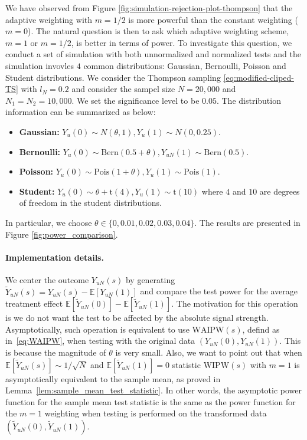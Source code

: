 \documentclass[12pt]{article}
\newcommand{\E}{\mathbb E}								%
\newcommand{\WAIPW}{\mathrm{WAIPW}}
\newcommand{\WIPW}{\mathrm{WIPW}}
\begin{document}
We have observed from Figure \ref{fig:simulation-rejection-plot-thompson} that the adaptive weighting with $m=1/2$ is more powerful than the constant weighting ($m=0$). The natural question is then to ask which adaptive weighting scheme, $m=1$ or $m=1/2$, is better in terms of power. To investigate this question, we conduct a set of simulation with both unnormalized and normalized tests and the simulation invovles $4$ common distributions: Gaussian, Bernoulli, Poisson and Student distributions. We consider the Thompson sampling \eqref{eq:modified-cliped-TS} with $l_N=0.2$ and consider the sampel size $N=20,000$ and $N_1=N_2=10,000$. We set the significance level to be $0.05$. The distribution information can be summarized as below:
\begin{itemize}
	\item \textbf{Gaussian:} $Y_{u}(0)\sim N(\theta,1),Y_{u}(1)\sim N(0,0.25)$.
	\item \textbf{Bernoulli:} $Y_{u}(0)\sim\mathrm{Bern}(0.5+\theta),Y_{uN}(1)\sim\mathrm{Bern}(0.5)$.
	\item \textbf{Poisson:} $Y_{u}(0)\sim \mathrm{Pois}(1+\theta),Y_{u}(1)\sim \mathrm{Pois}(1)$.
	\item \textbf{Student:} $Y_{u}(0)\sim \theta+\mathrm{t}(4),Y_{u}(1)\sim \mathrm{t}(10)$ where $4$ and $10$ are degrees of freedom in the student distributions.
\end{itemize}
In particular, we choose $\theta\in\{0, 0.01, 0.02, 0.03,0.04\}$. The results are presented in Figure \ref{fig:power_comparison}. 

\paragraph{Implementation details.}

We center the outcome $Y_{uN}(s)$ by generating $\tilde Y_{uN}(s)=Y_{uN}(s)-\E[Y_{uN}(1)]$ and compare the test power for the average treatment effect $\E[\tilde Y_{uN}(0)]-\E[\tilde Y_{uN}(1)]$. The motivation for this operation is we do not want the test to be affected by the absolute signal strength. Asymptotically, such operation is equivalent to use $\WAIPW(s)$, defind as in~\eqref{eq:WAIPW}, when testing with the original data $(Y_{uN}(0),Y_{uN}(1))$. This is because the magnitude of $\theta$ is very small. Also, we want to point out that when $\E[\tilde Y_{uN}(s)]\sim 1/\sqrt{N}$ and $\E[\tilde Y_{uN}(1)]=0$ statistic $\WIPW(s)$ with $m=1$ is asymptotically equivalent to the sample mean, as proved in Lemma~\ref{lem:sample_mean_test_statistic}. In other words, the asymptotic power function for the sample mean test statistic is the same as the power function for the $m=1$ weighting when testing is performed on the transformed data $(\tilde Y_{uN}(0), \tilde Y_{uN}(1))$. 
\end{document}
